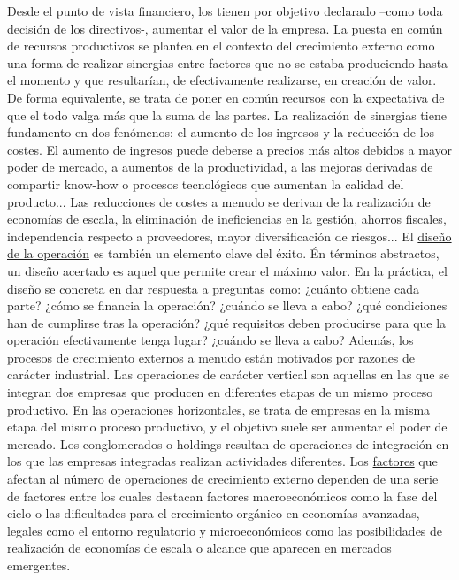 \documentclass{nuevotema}
\begin{document}
Desde el punto de vista financiero, los  tienen por objetivo declarado --como toda decisión de los directivos-, aumentar el valor de la empresa. La puesta en común de recursos productivos se plantea en el contexto del crecimiento externo como una forma de realizar sinergias entre factores que no se estaba produciendo hasta el momento y que resultarían, de efectivamente realizarse, en creación de valor. De forma equivalente, se trata de poner en común recursos con la expectativa de que el todo valga más que la suma de las partes. La realización de sinergias tiene fundamento en dos fenómenos: el aumento de los ingresos y la reducción de los costes. El aumento de ingresos puede deberse a precios más altos debidos a mayor poder de mercado, a aumentos de la productividad, a las mejoras derivadas de compartir know-how o procesos tecnológicos que aumentan la calidad del producto... Las reducciones de costes a menudo se derivan de la realización de economías de escala, la eliminación de ineficiencias en la gestión, ahorros fiscales, independencia respecto a proveedores, mayor diversificación de riesgos... El \underline{diseño de la operación} es también un elemento clave del éxito. Én términos abstractos, un diseño acertado es aquel que permite crear el máximo valor. En la práctica, el diseño se concreta en dar respuesta a preguntas como: ¿cuánto obtiene cada parte? ¿cómo se financia la operación? ¿cuándo se lleva a cabo? ¿qué condiciones han de cumplirse tras la operación? ¿qué requisitos deben producirse para que la operación efectivamente tenga lugar? ¿cuándo se lleva a cabo?  Además, los procesos de crecimiento externos a menudo están motivados por razones de carácter industrial. Las operaciones de carácter vertical son aquellas en las que se integran dos empresas que producen en diferentes etapas de un mismo proceso productivo. En las operaciones horizontales, se trata de empresas en la misma etapa del mismo proceso productivo, y el objetivo suele ser aumentar el poder de mercado. Los conglomerados o holdings resultan de operaciones de integración en los que las empresas integradas realizan actividades diferentes. Los \underline{factores} que afectan al número de operaciones de crecimiento externo dependen de una serie de factores entre los cuales destacan factores macroeconómicos como la fase del ciclo o las dificultades para el crecimiento orgánico en economías avanzadas, legales como el entorno regulatorio y microeconómicos como las posibilidades de realización de economías de escala o alcance que aparecen en mercados emergentes.
\end{document}
